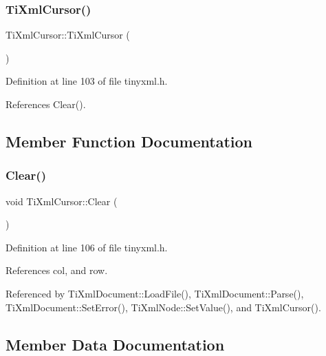 \subsubsection{\texorpdfstring{Ti\+Xml\+Cursor()}{TiXmlCursor()}}
{\footnotesize\ttfamily Ti\+Xml\+Cursor\+::\+Ti\+Xml\+Cursor (\begin{DoxyParamCaption}{ }\end{DoxyParamCaption})\hspace{0.3cm}{\ttfamily [inline]}}



Definition at line 103 of file tinyxml.\+h.



References Clear().



\subsection{Member Function Documentation}
\hypertarget{struct_ti_xml_cursor_a1e6fa622b59dafb71b6efe595105dcdd}{}\label{struct_ti_xml_cursor_a1e6fa622b59dafb71b6efe595105dcdd} 
\subsubsection{\texorpdfstring{Clear()}{Clear()}}
{\footnotesize\ttfamily void Ti\+Xml\+Cursor\+::\+Clear (\begin{DoxyParamCaption}{ }\end{DoxyParamCaption})\hspace{0.3cm}{\ttfamily [inline]}}



Definition at line 106 of file tinyxml.\+h.



References col, and row.



Referenced by Ti\+Xml\+Document\+::\+Load\+File(), Ti\+Xml\+Document\+::\+Parse(), Ti\+Xml\+Document\+::\+Set\+Error(), Ti\+Xml\+Node\+::\+Set\+Value(), and Ti\+Xml\+Cursor().



\subsection{Member Data Documentation}
\hypertarget{struct_ti_xml_cursor_a5694d7ed2c4d20109d350c14c417969d}{}\label{struct_ti_xml_cursor_a5694d7ed2c4d20109d350c14c417969d} 
